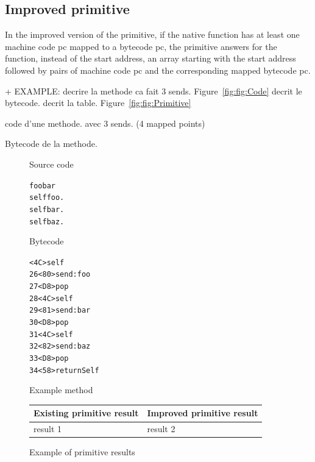 \documentclass[10pt,preprint]{sigplanconf}
\newcommand{\figref}[1]{Figure~\ref{fig:#1}}
\newenvironment{code}
    {\begin{alltt}\sffamily}
    {\end{alltt}\normalsize}
\begin{document}
\subsection{Improved primitive}

In the improved version of the primitive, if the native function has at least one machine code pc mapped to a bytecode pc, the primitive answers for the function, instead of the start address, an array starting with the start address followed by pairs of machine code pc and the corresponding mapped bytecode pc. 

+ EXAMPLE:
decrire la methode ca fait 3 sends. \figref{fig:Code} decrit le bytecode. decrit la table. \figref{fig:Primitive}

code d'une methode. avec 3 sends. (4 mapped points)

Bytecode de la methode.

\begin{figure}
    \begin{center}
    	Source code
	\begin{code}
	foobar
	\hspace{0.5cm} self foo.
	\hspace{0.5cm} self bar.
	\hspace{0.5cm} self baz.
	\end{code}
	Bytecode
	\begin{code}
	25 \textless4C\textgreater self
	26 \textless80\textgreater send: foo
	27 \textless{D8}\textgreater pop
	28 \textless4C\textgreater self
	29 \textless81\textgreater send: bar
	30 \textless{D8}\textgreater pop
	31 \textless4C\textgreater self
	32 \textless82\textgreater send: baz
	33 \textless{D8}\textgreater pop
	34 \textless58\textgreater returnSelf
	\end{code}
	\caption{Example method}
    \label{fig:Code}
    \end{center}
\end{figure}

\begin{figure}
    \begin{center}
		\noindent \begin{tabular}{l | l}
		Existing primitive result & Improved primitive result \\		
		\midrule
		result 1 & result 2 \\	
		\end{tabular}
	\caption{Example of primitive results}
    \label{fig:Primitive}
    \end{center}
\end{figure}
\end{document}
